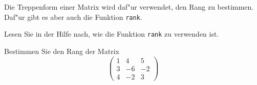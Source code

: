 Die Treppenform einer Matrix wird daf"ur verwendet, den Rang zu
bestimmen. Daf"ur gibt es aber auch die Funktion {\tt rank}.
\begin{teilaufgaben}
\item Lesen Sie in der Hilfe nach, wie die Funktion {\tt rank}
zu verwenden ist.
\item Bestimmen Sie den Rang der Matrix
\[
\begin{pmatrix}
1&4&5\\
3&-6&-2\\
4&-2&3
\end{pmatrix}
\]
\end{teilaufgaben}

\begin{loesung}
\begin{teilaufgaben}
\item
\item
{}
\end{teilaufgaben}
\end{loesung}

